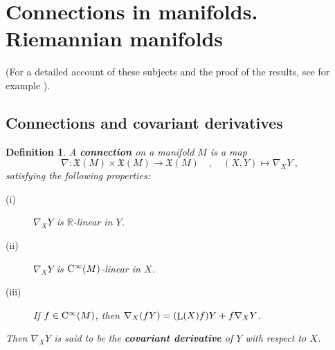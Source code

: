 \documentclass[12pt]{report}
\newtheorem{definition}[teor]{Definition}
\def\vf{\mathfrak X}
\def\Real{\mathbb{R}}
\def\Lie{\mathop{\rm L}\nolimits}
\def\Cinfty{{\rm C}^\infty}
\begin{document}
\section{Connections in manifolds. Riemannian manifolds}
\label{conexion}


(For a detailed account of these subjects and the proof of the results, see for example 
\cite{Con2001,GHV-72,Lang-95,Lee2013, Lee2018,GN-2014,Sp-72}).


\subsection{Connections and covariant derivatives}


\begin{definition}
A \textbf{connection} on a manifold $M$ is a map
$$
\nabla\colon\vf(M)\times\vf(M)\to\vf(M) \quad ,\quad (X,Y)\mapsto \nabla_X Y \ ,
$$
satisfying the following properties:
\begin{description}
\item[{\rm (i)}] $\nabla_X Y$ is $\Real$-linear in $Y$.
\item[{\rm (ii)}]  $\nabla_X Y$ is $\Cinfty(M)$-linear in $X$.
\item[{\rm (iii)}] If $f\in\Cinfty(M)$, then $\nabla_X (fY)=(\Lie(X)f)Y+f\nabla_X Y$.
\end{description}
Then $\nabla_X Y$ is said to be the \textbf{covariant derivative} of $Y$ with respect to $X$.
\end{definition}
\end{document}

